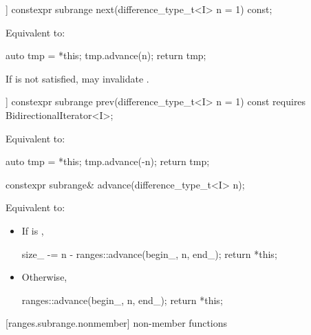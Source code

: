 %
\begin{itemdecl}
[[nodiscard]] constexpr subrange next(difference_type_t<I> n = 1) const;
\end{itemdecl}

\begin{itemdescr}
\pnum
\effects Equivalent to:
\begin{codeblock}
auto tmp = *this;
tmp.advance(n);
return tmp;
\end{codeblock}

\pnum
\enternote If  is not satisfied,  may
invalidate . \exitnote
\end{itemdescr}

%
\begin{itemdecl}
[[nodiscard]] constexpr subrange prev(difference_type_t<I> n = 1) const
  requires BidirectionalIterator<I>;
\end{itemdecl}

\begin{itemdescr}
\pnum
\effects Equivalent to:
\begin{codeblock}
auto tmp = *this;
tmp.advance(-n);
return tmp;
\end{codeblock}
\end{itemdescr}

%
\begin{itemdecl}
constexpr subrange& advance(difference_type_t<I> n);
\end{itemdecl}

\begin{itemdescr}
\pnum
\effects Equivalent to:
\begin{itemize}
\item If  is ,
\begin{codeblock}
size_ -= n - ranges::advance(begin_, n, end_);
return *this;
\end{codeblock}
\item Otherwise,
\begin{codeblock}
ranges::advance(begin_, n, end_);
return *this;
\end{codeblock}
\end{itemize}
\end{itemdescr}

[ranges.subrange.nonmember]{ non-member functions}

